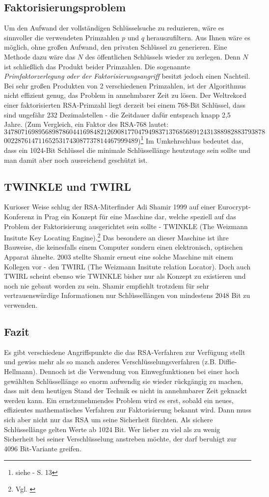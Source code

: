 \subsection{Faktorisierungsproblem}
Um den Aufwand der vollständigen Schlüsselsuche zu reduzieren, wäre es
sinnvoller die verwendeten Primzahlen $p$ und $q$ herauszufiltern. Aus Ihnen
wäre es möglich, ohne großen Aufwand, den privaten Schlüssel zu generieren. Eine
Methode dazu wäre das $N$ des öffentlichen Schlüssels wieder zu zerlegen. Denn
$N$ ist schließlich das Produkt beider Primzahlen.
Die sogenannte \emph{Primfaktorzerlegung oder der Faktorisierungsangriff}
besitzt jedoch einen Nachteil. Bei sehr großen Produkten von 2 verschiedenen
Primzahlen, ist der Algorithmus nicht effizient genug, das Problem in
annehmbarer Zeit zu lösen.
Der Weltrekord einer faktorisierten RSA-Primzahl liegt derzeit bei einem 768-Bit
Schlüssel, dass sind ungefähr 232 Dezimalstellen - die Zeitdauer dafür
entsprach knapp 2,5 Jahre.
(Zum Vergleich, ein Faktor des RSA-768 lautet: \newline
$347807169895689878604416984821269081770479498371376856891
2431388982883793878$\newline$002287614711652531743087737814467999489$)\footnote{siehe
\cite{768RSA} - S. 13}
Im Umkehrschluss bedeutet das, dass ein 1024-Bit Schlüssel die minimale
Schlüssellänge heutzutage sein sollte und man damit aber noch ausreichend
geschützt ist.
\subsection{TWINKLE und TWIRL}
Kurioser Weise schlug der RSA-Miterfinder Adi Shamir 1999 auf einer
Eurocrypt-Konferenz in Prag ein Konzept für eine Maschine dar, welche speziell
auf das Problem der Faktorisierung ausgerichtet sein sollte -
TWINKLE (The Weizmann Insitute Key Locating Engine).\footnote{Vgl.
\cite{TWINKLE}} Das besondere an dieser Maschine ist ihre Bauweise, die
keinesfalls einem Computer sondern einen elektronisch, optischen Apparat
ähnelte.
2003 stellte Shamir erneut eine solche Maschine mit einem Kollegen vor - den
TWIRL (The Weizmann Insitute relation Locator). Doch auch TWIRL scheint ebenso
wie TWINKLE bisher nur als Konzept zu existieren und noch nie gebaut worden zu
sein. Shamir empfiehlt trotzdem für sehr vertrauenswürdige Informationen nur
Schlüssellängen von mindestens 2048 Bit zu verwenden.
\subsection{Fazit}
Es gibt verschiedene Angriffspunkte die das RSA-Verfahren zur Verfügung stellt
und gewiss mehr als so manch anderes Verschlüsselungsverfahren (z.B.
Diffie-Hellmann). Dennoch ist die Verwendung von Einwegfunktionen bei einer hoch
gewählten Schlüssellänge so enorm aufwendig sie wieder rückgängig zu machen,
dass mit dem heutigen Stand der Technik es nicht in annehmbarer Zeit geknackt
werden kann. Ein ernstzunehmendes Problem wird es erst, sobald ein neues,
effizientes mathematisches Verfahren zur Faktorisierung bekannt wird. Dann muss
sich aber nicht nur das RSA um seine Sicherheit fürchten.
Als sichere Schlüssellänge gelten Werte ab 1024 Bit. Wer lieber zu viel als zu
wenig Sicherheit bei seiner Verschlüsselung anstreben möchte, der darf beruhigt
zur 4096 Bit-Variante greifen.
